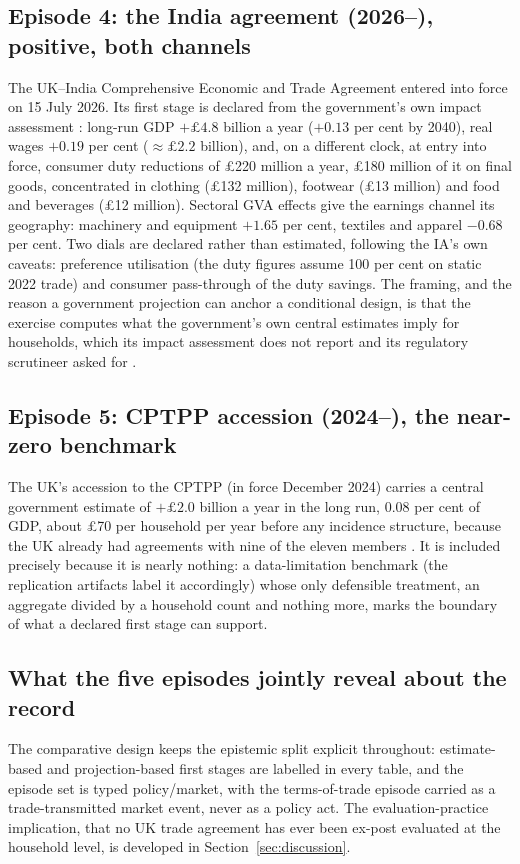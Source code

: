\subsection{Episode 4: the India agreement (2026--), positive, both channels}

The UK--India Comprehensive Economic and Trade Agreement entered into
force on 15 July 2026. Its first stage is declared from the
government's own impact assessment \citep{dbtindia2026}: long-run GDP
$+\pounds 4.8$ billion a year ($+0.13$ per cent by 2040), real wages
$+0.19$ per cent ($\approx\pounds 2.2$ billion), and, on a different
clock, at entry into force, consumer duty reductions of \pounds 220
million a year, \pounds 180 million of it on final goods, concentrated
in clothing (\pounds 132 million), footwear (\pounds 13 million) and
food and beverages (\pounds 12 million). Sectoral GVA effects give the
earnings channel its geography: machinery and equipment $+1.65$ per
cent, textiles and apparel $-0.68$ per cent. Two dials are declared
rather than estimated, following the IA's own caveats: preference
utilisation (the duty figures assume 100 per cent on static 2022
trade) and consumer pass-through of the duty savings. The
framing, and the reason a government projection can anchor a
conditional design, is that the exercise computes what the
government's own central estimates imply for households, which its
impact assessment does not report and its regulatory scrutineer asked
for \citep{rpc2026}.

\subsection{Episode 5: CPTPP accession (2024--), the near-zero benchmark}

The UK's accession to the CPTPP (in force December 2024) carries a
central government estimate of $+\pounds 2.0$ billion a year in the
long run, 0.08 per cent of GDP, about \pounds 70 per household per
year before any incidence structure, because the UK already had
agreements with nine of the eleven members \citep{dbtcptpp2023}. It is
included precisely because it is nearly nothing: a data-limitation
benchmark (the replication artifacts label it accordingly) whose only
defensible treatment, an aggregate divided by a household count and
nothing more, marks the boundary of what a declared first stage can
support.

\subsection{What the five episodes jointly reveal about the record}

The comparative design keeps the epistemic split explicit throughout:
estimate-based and projection-based first stages are labelled in every
table, and the episode set is typed policy/market, with the
terms-of-trade episode carried as a trade-transmitted market event,
never as a policy act. The evaluation-practice implication, that no UK
trade agreement has ever been ex-post evaluated at the household
level, is developed in Section~\ref{sec:discussion}.

